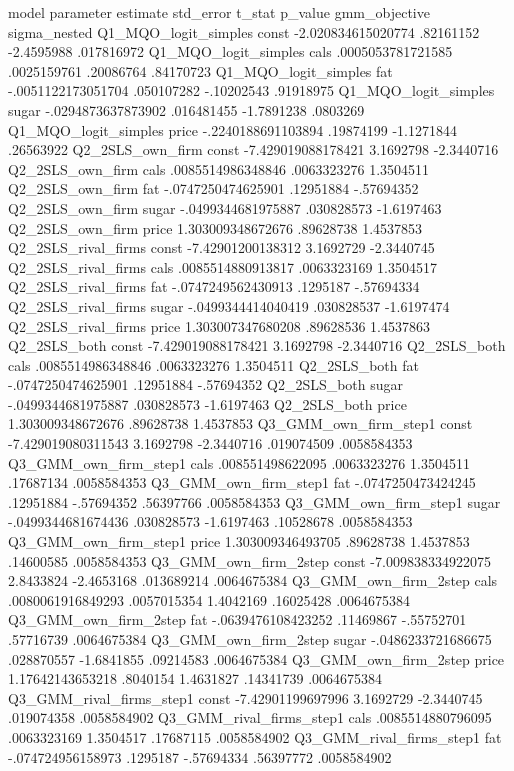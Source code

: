 model	parameter	estimate	std_error	t_stat	p_value	gmm_objective	sigma_nested
Q1_MQO_logit_simples	const	-2.020834615020774	.82161152	-2.4595988	.017816972		
Q1_MQO_logit_simples	cals	.0005053781721585	.0025159761	.20086764	.84170723		
Q1_MQO_logit_simples	fat	-.0051122173051704	.050107282	-.10202543	.91918975		
Q1_MQO_logit_simples	sugar	-.0294873637873902	.016481455	-1.7891238	.0803269		
Q1_MQO_logit_simples	price	-.2240188691103894	.19874199	-1.1271844	.26563922		
Q2_2SLS_own_firm	const	-7.429019088178421	3.1692798	-2.3440716			
Q2_2SLS_own_firm	cals	.0085514986348846	.0063323276	1.3504511			
Q2_2SLS_own_firm	fat	-.0747250474625901	.12951884	-.57694352			
Q2_2SLS_own_firm	sugar	-.0499344681975887	.030828573	-1.6197463			
Q2_2SLS_own_firm	price	1.303009348672676	.89628738	1.4537853			
Q2_2SLS_rival_firms	const	-7.42901200138312	3.1692729	-2.3440745			
Q2_2SLS_rival_firms	cals	.0085514880913817	.0063323169	1.3504517			
Q2_2SLS_rival_firms	fat	-.0747249562430913	.1295187	-.57694334			
Q2_2SLS_rival_firms	sugar	-.0499344414040419	.030828537	-1.6197474			
Q2_2SLS_rival_firms	price	1.303007347680208	.89628536	1.4537863			
Q2_2SLS_both	const	-7.429019088178421	3.1692798	-2.3440716			
Q2_2SLS_both	cals	.0085514986348846	.0063323276	1.3504511			
Q2_2SLS_both	fat	-.0747250474625901	.12951884	-.57694352			
Q2_2SLS_both	sugar	-.0499344681975887	.030828573	-1.6197463			
Q2_2SLS_both	price	1.303009348672676	.89628738	1.4537853			
Q3_GMM_own_firm_step1	const	-7.429019080311543	3.1692798	-2.3440716	.019074509	.0058584353	
Q3_GMM_own_firm_step1	cals	.008551498622095	.0063323276	1.3504511	.17687134	.0058584353	
Q3_GMM_own_firm_step1	fat	-.0747250473424245	.12951884	-.57694352	.56397766	.0058584353	
Q3_GMM_own_firm_step1	sugar	-.0499344681674436	.030828573	-1.6197463	.10528678	.0058584353	
Q3_GMM_own_firm_step1	price	1.303009346493705	.89628738	1.4537853	.14600585	.0058584353	
Q3_GMM_own_firm_2step	const	-7.009838334922075	2.8433824	-2.4653168	.013689214	.0064675384	
Q3_GMM_own_firm_2step	cals	.0080061916849293	.0057015354	1.4042169	.16025428	.0064675384	
Q3_GMM_own_firm_2step	fat	-.0639476108423252	.11469867	-.55752701	.57716739	.0064675384	
Q3_GMM_own_firm_2step	sugar	-.0486233721686675	.028870557	-1.6841855	.09214583	.0064675384	
Q3_GMM_own_firm_2step	price	1.17642143653218	.8040154	1.4631827	.14341739	.0064675384	
Q3_GMM_rival_firms_step1	const	-7.42901199697996	3.1692729	-2.3440745	.019074358	.0058584902	
Q3_GMM_rival_firms_step1	cals	.0085514880796095	.0063323169	1.3504517	.17687115	.0058584902	
Q3_GMM_rival_firms_step1	fat	-.074724956158973	.1295187	-.57694334	.56397772	.0058584902	
